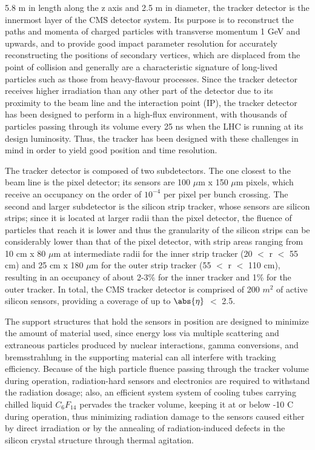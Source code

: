 5.8 m in length along the z axis and 2.5 m in diameter, the tracker detector is the innermost layer of the CMS detector system. Its purpose is to reconstruct the paths and momenta of charged particles with transverse momentum 1 GeV and upwards, and to provide good impact parameter resolution for accurately reconstructing the positions of secondary vertices, which are displaced from the point of collision and generally are a characteristic signature of long-lived particles such as those from heavy-flavour processes. Since the tracker detector receives higher irradiation than any other part of the detector due to its proximity to the beam line and the interaction point (IP), the tracker detector has been designed to perform in a high-flux environment, with thousands of particles passing through its volume every 25 ns when the LHC is running at its design luminosity. Thus, the tracker has been designed with these challenges in mind in order to yield good position and time resolution.

The tracker detector is composed of two subdetectors. The one closest to the beam line is the pixel detector; its sensors are 100 $\mu$m x 150 $\mu$m pixels, which receive an occupancy on the order of $10^{-4}$ per pixel per bunch crossing. The second and larger subdetector is the silicon strip tracker, whose sensors are silicon strips; since it is located at larger radii than the pixel detector, the fluence of particles that reach it is lower and thus the granularity of the silicon strips can be considerably lower than that of the pixel detector, with strip areas ranging from 10 cm x 80 $\mu$m at intermediate radii for the inner strip tracker (20 $<$ r $<$ 55 cm) and 25 cm x 180 $\mu$m for the outer strip tracker (55 $<$ r $<$ 110 cm), resulting in an occupancy of about 2-3\% for the inner tracker and 1\% for the outer tracker. In total, the CMS tracker detector is comprised of 200 $m^{2}$ of active silicon sensors, providing a coverage of up to $\abs{\eta}$ $<$ 2.5.

The support structures that hold the sensors in position are designed to minimize the amount of material used, since energy loss via multiple scattering and extraneous particles produced by nuclear interactions, gamma conversions, and bremsstrahlung in the supporting material can all interfere with tracking efficiency. Because of the high particle fluence passing through the tracker volume during operation, radiation-hard sensors and electronics are required to withstand the radiation dosage; also, an efficient system system of cooling tubes carrying chilled liquid $C_{6}F_{14}$ pervades the tracker volume, keeping it at or below -10 C during operation, thus minimizing radiation damage to the sensors caused either by direct irradiation or by the annealing of radiation-induced defects in the silicon crystal structure through thermal agitation.

